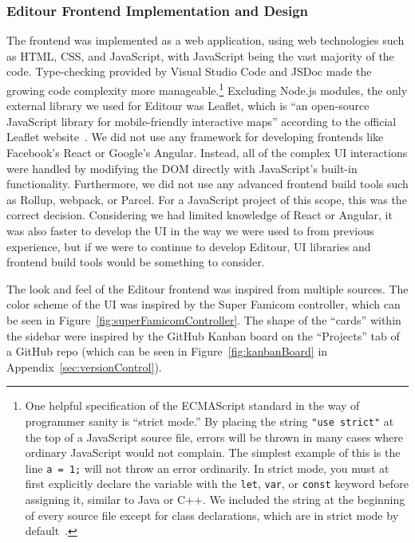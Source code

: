 \documentclass[a4paper, 10pt, american, titlepage]{article}
\begin{document}
\subsubsection{Editour Frontend Implementation and Design}
\label{sec:editourFrontendImplementation}

The frontend was implemented as a web application, using web technologies such
as HTML, CSS, and JavaScript, with JavaScript being the vast majority of the
code. Type-checking provided by Visual Studio Code and JSDoc made the growing
code complexity more manageable.\footnote{One helpful specification of the
ECMAScript standard in the way of programmer sanity is ``strict mode.'' By
placing the string \texttt{"use strict"} at the top of a JavaScript source file,
errors will be thrown in many cases where ordinary JavaScript would not
complain. The simplest example of this is the line \texttt{a = 1;} will not
throw an error ordinarily. In strict mode, you must at first explicitly declare
the variable with the \texttt{let}, \texttt{var}, or \texttt{const} keyword
before assigning it, similar to Java or C++. We included the string at the
beginning of every source file except for class declarations, which are in
strict mode by default~\autocite[386]{ecmainternational2019}.} Excluding Node.js
modules, the only external library we used for Editour was Leaflet, which is
``an open-source JavaScript library for mobile-friendly interactive maps''
according to the official Leaflet website~\autocite{leafletjs}. We did not use
any framework for developing frontends like Facebook's React or Google's
Angular. Instead, all of the complex UI interactions were handled by modifying
the DOM directly with JavaScript's built-in functionality. Furthermore, we did
not use any advanced frontend build tools such as Rollup, webpack, or Parcel.
For a JavaScript project of this scope, this was the correct decision.
Considering we had limited knowledge of React or Angular, it was also faster to
develop the UI in the way we were used to from previous experience, but if we
were to continue to develop Editour, UI libraries and frontend build tools would
be something to consider.

The look and feel of the Editour frontend was inspired from multiple sources.
The color scheme of the UI was inspired by the Super Famicom controller, which
can be seen in Figure~\ref{fig:superFamicomController}. The shape of the
``cards'' within the sidebar were inspired by the GitHub Kanban board on the
``Projects'' tab of a GitHub repo (which can be seen in
Figure~\ref{fig:kanbanBoard} in Appendix~\ref{sec:versionControl}).
\end{document}
